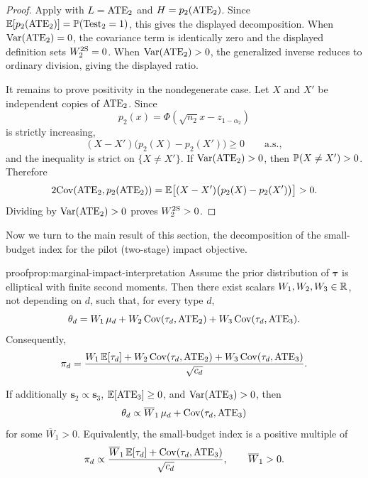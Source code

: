 \begin{proof}
  Apply  with \(L=\ATE_2\) and \(H=p_2(\ATE_2)\).
  Since \(\E[p_2(\ATE_2)]=\P(\Test_2=1)\), this gives the displayed decomposition.
  When \(\var(\ATE_2)=0\), the covariance term is identically zero and the displayed definition sets \(W_2^{\twosuccess}=0\).
  When \(\var(\ATE_2)>0\), the generalized inverse reduces to ordinary division, giving the displayed ratio.

  It remains to prove positivity in the nondegenerate case.
  Let \(X\) and \(X'\) be independent copies of \(\ATE_2\).
  Since
  \[
    p_2(x)=\Phi(\sqrt{n_2}x-z_{1-\alpha_2})
  \]
  is strictly increasing,
  \[
    (X-X')\bigl(p_2(X)-p_2(X')\bigr)\ge0
    \qquad\text{a.s.},
  \]
  and the inequality is strict on \(\{X\ne X'\}\).
  If \(\var(\ATE_2)>0\), then \(\P(X\ne X')>0\).
  Therefore
  \[
    2\cov(\ATE_2,p_2(\ATE_2))
    =
    \E\!\left[(X-X')\bigl(p_2(X)-p_2(X')\bigr)\right]
    >0.
  \]
  Dividing by \(\var(\ATE_2)>0\) proves \(W_2^{\twosuccess}>0\).
\end{proof}

Now we turn to the main result of this section, the decomposition of the small-budget index for the pilot (two-stage) impact objective.

\begin{linkedresult}{proof}{prop:marginal-impact-interpretation}
  \label{prop:marginal-impact-interpretation-appendix}
  Assume the prior distribution of \(\bm\tau\) is elliptical with finite second moments.
  Then there exist scalars \(W_1,W_2,W_3\in\R\), not depending on \(d\), such that, for every type \(d\),
  \[
    \theta_d
    =
    W_1\,\mu_d
    +
    W_2\,\cov(\tau_d,\ATE_2)
    +
    W_3\,\cov(\tau_d,\ATE_3).
  \]
  Consequently,
  \[
    \idx_d
    =
    \frac{
      W_1\,\E[\tau_d]
      +
      W_2\,\cov(\tau_d,\ATE_2)
      +
      W_3\,\cov(\tau_d,\ATE_3)
    }{\sqrt{c_d}}.
  \]

  If additionally \(\bm s_2\propto\bm s_3\), \(\E[\ATE_3]\ge0\), and \(\var(\ATE_3)>0\), then
  \[
    \theta_d
    \propto
    \overline W_1\,\mu_d+
    \cov(\tau_d,\ATE_3)
  \]
  for some \(\overline W_1>0\).
  Equivalently, the small-budget index is a positive multiple of
  \[
    \idx_d
    \propto
    \frac{
      \overline W_1\,\E[\tau_d]
      +
      \cov(\tau_d,\ATE_3)
    }{\sqrt{c_d}},
    \qquad
    \overline W_1>0.
  \]
\end{linkedresult}

